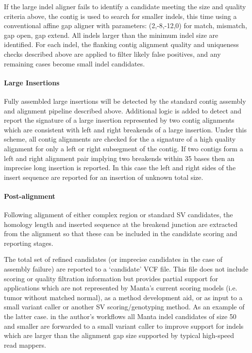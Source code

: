 \documentclass{article}
\begin{document}
If the large indel aligner fails to identify a candidate meeting the size and quality criteria above, the contig is used to search for smaller indels, this time using a conventional affine gap aligner with parameters: (2,-8,-12,0) for match, mismatch, gap open, gap extend. All indels larger than the minimum indel size are identified. For each indel, the flanking contig alignment quality and uniqueness checks described above are applied to filter likely false positives, and any remaining cases become small indel candidates.

\paragraph{Large Insertions}

Fully assembled large insertions will be detected by the standard contig assembly and alignment pipeline described above. Additional logic is added to detect and report the signature of a large insertion represented by two contig alignments which are consistent with left and right breakends of a large insertion. Under this scheme, all contig alignments are checked for the a signature of a high quality alignment for only a left or right subsegment of the contig. If two contigs form a left and right alignment pair implying two breakends within 35 bases then an imprecise long insertion is reported. In this case the left and right sides of the insert sequence are reported for an insertion of unknown total size.

\paragraph{Post-alignment}
Following alignment of either complex region or standard SV candidates, the homology length and inserted sequence at the breakend junction are extracted from the alignment so that these can be included in the candidate scoring and reporting stages.

The total set of refined candidates (or imprecise candidates in the case of assembly failure) are reported to a `candidate' VCF file. This file does not include scoring or quality filtration information but provides partial support for applications which are not represented by Manta's current scoring models (i.e. tumor without matched normal), as a method development aid, or as input to a small variant caller or another SV scoring/genotyping method. As an example of the latter case. in the author's workflows all Manta indel candidates of size 50 and smaller are forwarded to a small variant caller to improve support for indels which are larger than the alignment gap size supported by typical high-speed read mappers.
\end{document}
